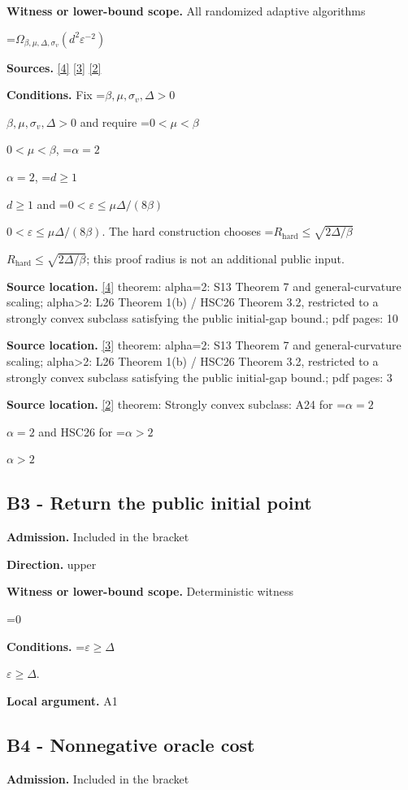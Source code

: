 \documentclass[10pt,a4paper]{article}
\newcommand{\AtlasMath}[1]{\par\begingroup\centering\setbox0=\hbox{$\displaystyle #1$}\ifdim\wd0>1.4\linewidth\typeout{ATLAS WIDE FORMULA: \the\wd0}\fi\ifdim\wd0>\linewidth\resizebox{\linewidth}{!}{\box0}\else\box0\fi\par\endgroup}
\newcommand{\AtlasInlineMath}[1]{\begingroup\setbox0=\hbox{$#1$}\ifdim\wd0>.4\linewidth\endgroup\AtlasMath{#1}\else\endgroup$#1$\fi}
\begin{document}
\textbf{Witness or lower-bound scope.} All randomized adaptive algorithms

\AtlasMath{\Omega_{\beta,\mu,\Delta,\sigma_v}(d^2\varepsilon^{-2})}
\textbf{Sources.} \href{https://proceedings.mlr.press/v30/Shamir13.html}{[4]} \href{https://arxiv.org/pdf/2610.05517v2}{[3]} \href{https://arxiv.org/html/2610.00276v2}{[2]}

\textbf{Conditions.} Fix \AtlasInlineMath{\beta,\mu,\sigma_v,\Delta>0} and require \AtlasInlineMath{0<\mu<\beta}, \AtlasInlineMath{\alpha=2}, \AtlasInlineMath{d\ge1} and \AtlasInlineMath{0<\varepsilon\le\mu\Delta/(8\beta)}. The hard construction chooses \AtlasInlineMath{R_{\mathrm{hard}}\le\sqrt{2\Delta/\beta}}; this proof radius is not an additional public input.

\textbf{Source location.} \href{https://proceedings.mlr.press/v30/Shamir13.html}{[4]} theorem: alpha=2: S13 Theorem 7 and general-curvature scaling; alpha>2: L26 Theorem 1(b) / HSC26 Theorem 3.2, restricted to a strongly convex subclass satisfying the public initial-gap bound.; pdf pages: 10

\textbf{Source location.} \href{https://arxiv.org/pdf/2610.05517v2}{[3]} theorem: alpha=2: S13 Theorem 7 and general-curvature scaling; alpha>2: L26 Theorem 1(b) / HSC26 Theorem 3.2, restricted to a strongly convex subclass satisfying the public initial-gap bound.; pdf pages: 3

\textbf{Source location.} \href{https://arxiv.org/html/2610.00276v2}{[2]} theorem: Strongly convex subclass: A24 for \AtlasInlineMath{\alpha=2} and HSC26 for \AtlasInlineMath{\alpha>2}

\subsection{B3 - Return the public initial point}
\textbf{Admission.} Included in the bracket

\textbf{Direction.} upper

\textbf{Witness or lower-bound scope.} Deterministic witness

\AtlasMath{0}
\textbf{Conditions.} \AtlasInlineMath{\varepsilon\ge \Delta}.

\textbf{Local argument.} A1

\subsection{B4 - Nonnegative oracle cost}
\textbf{Admission.} Included in the bracket
\end{document}
